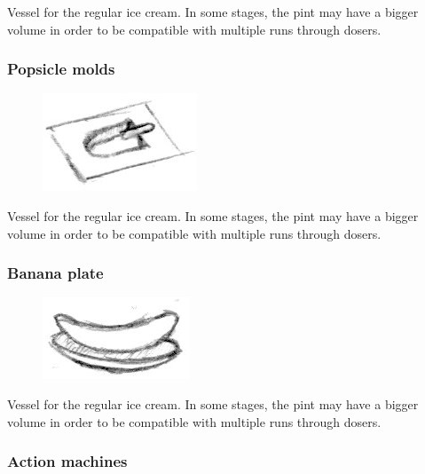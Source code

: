 \documentclass[a4paper]{scrartcl}
\begin{document}
            Vessel for the regular ice cream. In some stages, the pint may have
            a bigger volume in order to be compatible with multiple runs through
            dosers.

        \subsubsection{Popsicle molds}
            \begin{figure}
                \vspace{-20pt}
                \includegraphics[scale=1]{devices/popsicle_molds}
                \vspace{-20pt}
            \end{figure}
            
            Vessel for the regular ice cream. In some stages, the pint may have
            a bigger volume in order to be compatible with multiple runs through
            dosers.

        \subsubsection{Banana plate}
            \begin{figure}
                \vspace{-20pt}
                \includegraphics[scale=1]{devices/banana_plate}
                \vspace{-20pt}
            \end{figure}
            
            Vessel for the regular ice cream. In some stages, the pint may have
            a bigger volume in order to be compatible with multiple runs through
            dosers.

    \subsubsection{Action machines}
\end{document}
